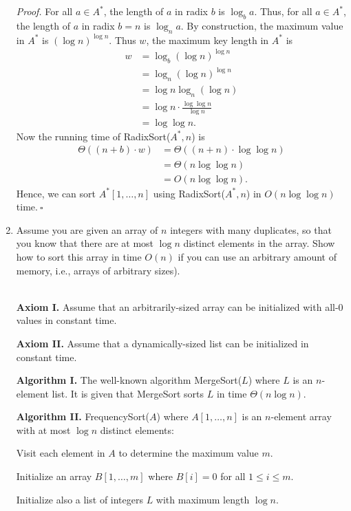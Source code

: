 \begin{enumerate}
\begin{solution}
\textit{Proof. }For all $a\in A^*$, the length of $a$ in radix $b$ is $\log_ba$. Thus, for all $a\in A^*$, the length of $a$ in radix $b=n$ is $\log_na$. By construction, the maximum value in $A^*$ is $(\log n)^{\log n}$. Thus $w$, the maximum key length in $A^*$ is
\begin{align*}
w&=\log_b(\log n)^{\log n}\\
&=\log_n(\log n)^{\log n}\\
&=\log n\log_n(\log n)\\
&=\log n\cdot\frac{\log\log n}{\log n}\\
&=\log\log n.
\end{align*}
Now the running time of {\sc RadixSort}($A^*,n$) is
\begin{align*}
\Theta((n+b)\cdot w)&=\Theta((n+n)\cdot\log\log n)\\
&=\Theta(n\log\log n)\\
&=O(n\log\log n).
\end{align*}
Hence, we can sort $A^*[1,\dots,n]$ using {\sc RadixSort}($A^*,n$) in $O(n\log\log n)$ time.$~\square$
\end{solution}
\newpage
\item Assume you are given an array of $n$ integers with many
duplicates, so that you know that there are at most $\log n$
distinct elements in the array. Show how to sort this array in time
$O(n)$ if you can use an arbitrary amount of memory, i.e., arrays of arbitrary sizes).
\begin{solution}\\

\textbf{Axiom I. }Assume that an arbitrarily-sized array can be initialized with all-$0$ values in constant time.

\textbf{Axiom II. }Assume that a dynamically-sized list can be initialized in constant time.

\textbf{Algorithm I. }The well-known algorithm {\sc MergeSort}($L$) where $L$ is an $n$-element list. It is given that {\sc MergeSort} sorts $L$ in time $\Theta(n\log n)$.

\textbf{Algorithm II. }{\sc FrequencySort}($A$) where $A[1,\dots,n]$ is an $n$-element array with at most $\log n$ distinct elements:

Visit each element in $A$ to determine the maximum value $m$.

Initialize an array $B[1,\dots,m]$ where $B[i]=0$ for all $1\leq i\leq m$. 

Initialize also a list of integers $L$ with maximum length $\log n$.


\end{solution}
\end{enumerate}
